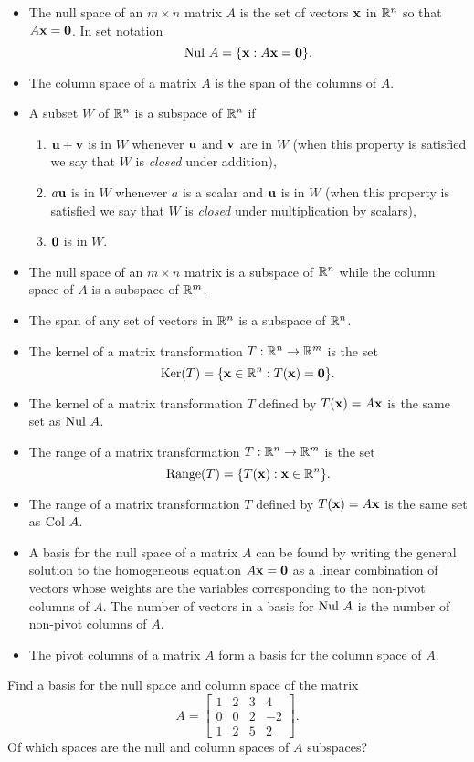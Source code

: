 \begin{itemize}
\item The null space of an $m \times n$ matrix $A$ is the set of vectors $\mathbf{x}$ in $\mathbb{R}^n$ so that $A \mathbf{x} = \mathbf{0}$. In set notation
\[\text{Nul } A = \{\mathbf{x} : A \mathbf{x} = \mathbf{0}\}.\]
\item The column space of a matrix $A$ is the span of the columns of $A$.
\item A subset $W$ of $\mathbb{R}^n$ is a subspace of $\mathbb{R}^n$ if
\begin{enumerate}
\item $\mathbf{u} + \mathbf{v}$ is in $W$ whenever $\mathbf{u}$ and $\mathbf{v}$ are in $W$ (when this property is satisfied we say that $W$ is \emph{closed} under addition),
\item $a \mathbf{u}$ is in $W$ whenever $a$ is a scalar and $\mathbf{u}$ is in $W$ (when this property is satisfied we say that $W$ is \emph{closed} under multiplication by scalars),
\item $\mathbf{0}$ is in $W$.
\end{enumerate}
\item The null space of an $m \times n$ matrix is a subspace of $\mathbb{R}^n$ while the column space of $A$ is a subspace of $\mathbb{R}^m$.
\item The span of any set of vectors in $\mathbb{R}^n$ is a subspace of $\mathbb{R}^n$. 
\item The kernel of a matrix transformation $T : \mathbb{R}^n \to \mathbb{R}^m$ is the set 
\[\text{Ker}(T) = \{\mathbf{x} \in \mathbb{R}^n : T(\mathbf{x}) = \mathbf{0}\}.\]
\item The kernel of a matrix transformation $T$ defined by $T(\mathbf{x}) = A\mathbf{x}$ is the same set as $\text{Nul } A$. 
\item The range of a matrix transformation $T : \mathbb{R}^n \to \mathbb{R}^m$ is the set 
\[\text{Range}(T) = \{T(\mathbf{x}) : \mathbf{x} \in \mathbb{R}^n\}.\]
\item The range of a matrix transformation $T$ defined by $T(\mathbf{x}) = A\mathbf{x}$ is the same set as $\text{Col } A$. 
\item A basis for the null space of a matrix $A$ can be found by writing the general solution to the homogeneous equation $A \mathbf{x} = \mathbf{0}$ as a linear combination of vectors whose weights are the variables corresponding to the non-pivot columns of $A$. The number of vectors in a basis for $\text{Nul } A$ is the number of non-pivot columns of $A$.
\item The pivot columns of a matrix $A$ form a basis for the column space of $A$.
\end{itemize}



\be
\item Find a basis for the null space and column space of the matrix 
\[A=\left[ \begin{array}{cccr} 1 & 2& 3& 4\\ 0 & 0 & 2 & -2 \\ 1 & 2 & 5 & 2 \end{array} \right].\]
Of which spaces are the null and column spaces of $A$ subspaces?

